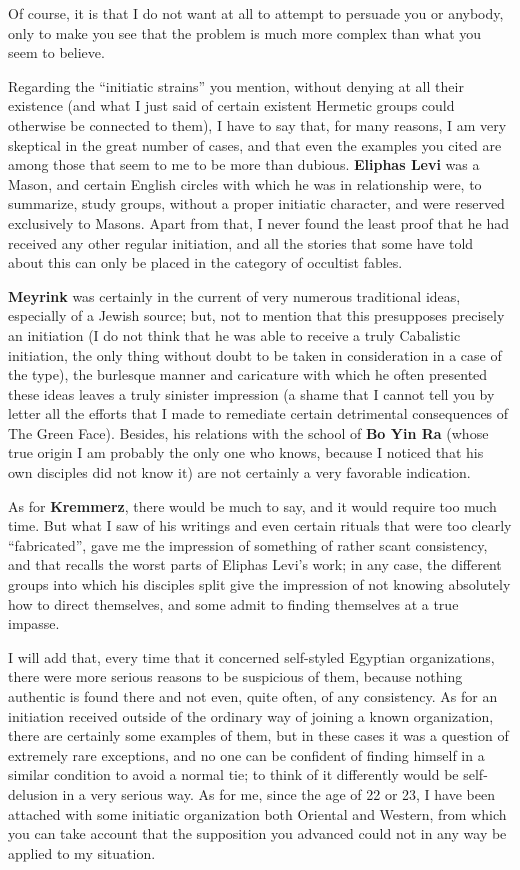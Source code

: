Of course, it is that I do not want at all to attempt to persuade you or anybody, only to make you see that the problem is much more complex than what you seem to believe.

Regarding the “initiatic strains” you mention, without denying at all their existence (and what I just said of certain existent Hermetic groups could otherwise be connected to them), I have to say that, for many reasons, I am very skeptical in the great number of cases, and that even the examples you cited are among those that seem to me to be more than dubious. \textbf{Eliphas Levi} was a Mason, and certain English circles with which he was in relationship were, to summarize, study groups, without a proper initiatic character, and were reserved exclusively to Masons. Apart from that, I never found the least proof that he had received any other regular initiation, and all the stories that some have told about this can only be placed in the category of occultist fables.

\textbf{Meyrink} was certainly in the current of very numerous traditional ideas, especially of a Jewish source; but, not to mention that this presupposes precisely an initiation (I do not think that he was able to receive a truly Cabalistic initiation, the only thing without doubt to be taken in consideration in a case of the type), the burlesque manner and caricature with which he often presented these ideas leaves a truly sinister impression (a shame that I cannot tell you by letter all the efforts that I made to remediate certain detrimental consequences of The Green Face). Besides, his relations with the school of \textbf{Bo Yin Ra} (whose true origin I am probably the only one who knows, because I noticed that his own disciples did not know it) are not certainly a very favorable indication.

As for \textbf{Kremmerz}, there would be much to say, and it would require too much time. But what I saw of his writings and even certain rituals that were too clearly “fabricated”, gave me the impression of something of rather scant consistency, and that recalls the worst parts of Eliphas Levi's work; in any case, the different groups into which his disciples split give the impression of not knowing absolutely how to direct themselves, and some admit to finding themselves at a true impasse.

I will add that, every time that it concerned self-styled Egyptian organizations, there were more serious reasons to be suspicious of them, because nothing authentic is found there and not even, quite often, of any consistency. As for an initiation received outside of the ordinary way of joining a known organization, there are certainly some examples of them, but in these cases it was a question of extremely rare exceptions, and no one can be confident of finding himself in a similar condition to avoid a normal tie; to think of it differently would be self-delusion in a very serious way. As for me, since the age of 22 or 23, I have been attached with some initiatic organization both Oriental and Western, from which you can take account that the supposition you advanced could not in any way be applied to my situation.

